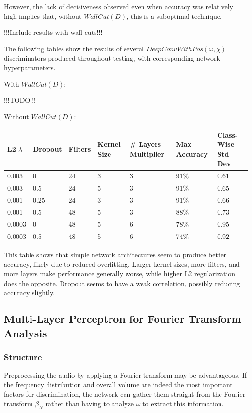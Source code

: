 \documentclass[10pt]{article}
\begin{document}
However, the lack of decisiveness observed even when accuracy was relatively high implies that, without $WallCut(D)$, this is a suboptimal technique.

!!!Include results with wall cuts!!!

The following tables show the results of several $DeepConvWithPos(\omega, \chi)$ discriminators produced throughout testing, with corresponding network hyperparameters.

With $WallCut(D)$:

!!!TODO!!!

Without $WallCut(D)$:

\begin{tabular}{|l|l|l|l|l|l|l|}
    \hline
    L2 $\lambda$ & Dropout & Filters & Kernel Size & \# Layers Multiplier & Max Accuracy & Class-Wise Std Dev \\
    \hline
    0.003 & 0 & 24 & 3 & 3 & 91\% & 0.61 \\
    \hline
    0.003 & 0.5 & 24 & 5 & 3 & 91\% & 0.65 \\
    \hline
    0.001 & 0.25 & 24 & 3 & 3 & 91\% & 0.66 \\
    \hline
    0.001 & 0.5 & 48 & 5 & 3 & 88\% & 0.73 \\
    \hline
    0.0003 & 0 & 48 & 5 & 6 & 78\% & 0.95 \\
    \hline
    0.0003 & 0.5 & 48 & 5 & 6 & 74\% & 0.92 \\
    \hline
\end{tabular}

This table shows that simple network architectures seem to produce better accuracy, likely due to reduced overfitting. Larger kernel sizes, more filters, and more layers make performance generally worse, while higher L2 regularization does the opposite. Dropout seems to have a weak correlation, possibly reducing accuracy slightly.

\subsection{Multi-Layer Perceptron for Fourier Transform Analysis}

\subsubsection{Structure}

Preprocessing the audio by applying a Fourier transform may be advantageous. If the frequency distribution and overall volume are indeed the most important factors for discrimination, the network can gather them straight from the Fourier transform $\beta_{N}$ rather than having to analyze $\omega$ to extract this information.
\end{document}
